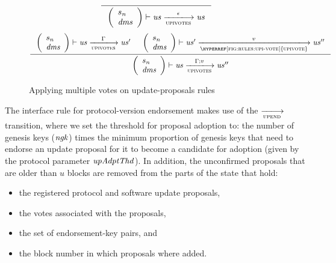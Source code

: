 \begin{figure}[htb]
  \begin{equation}
    \label{eq:rule:upi-votes-base}
    \inference
    {
    }
    {
      {\left(
        \begin{array}{l}
          s_n\\
          \var{dms}
        \end{array}
      \right)}
      \vdash
      \var{us}
      \trans{upivotes}{\epsilon}
      \var{us}
    }
  \end{equation}
  \begin{equation}
    \label{eq:rule:upi-votes-ind}
    \inference
    {
      {\left(
        \begin{array}{l}
          s_n\\
          \var{dms}
        \end{array}
      \right)}
      \vdash
      \var{us}
      \trans{upivotes}{\Gamma}
      \var{us'}
      &
      {\left(
        \begin{array}{l}
          s_n\\
          \var{dms}
        \end{array}
      \right)}
      \vdash
      \var{us'}
      \trans{\hyperref[fig:rules:upi-vote]{upivote}}{v}
      \var{us''}
    }
    {
      {\left(
        \begin{array}{l}
          s_n\\
          \var{dms}
        \end{array}
      \right)}
      \vdash
      \var{us}
      \trans{upivotes}{\Gamma;v}
      \var{us''}
    }
  \end{equation}
  \caption{Applying multiple votes on update-proposals rules}
  \label{fig:rules:upi-votes}
\end{figure}
\clearpage

The interface rule for protocol-version endorsement makes use of the
$\trans{upend}{}$ transition, where we set the threshold for proposal adoption
to: the number of genesis keys ($\mathit{ngk}$) times the minimum proportion of
genesis keys that need to endorse an update proposal for it to become a
candidate for adoption (given by the protocol parameter $\mathit{upAdptThd}$). In
addition, the unconfirmed proposals that are older than $u$ blocks are removed
from the parts of the state that hold:
\begin{itemize}
\item the registered protocol and software update proposals,
\item the votes associated with the proposals,
\item the set of endorsement-key pairs, and
\item the block number in which proposals where added.
\end{itemize}

